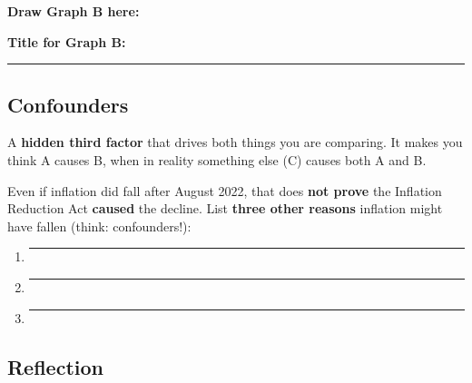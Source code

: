 \documentclass[letterpaper,10pt]{article}
\begin{document}
\vspace{1em}
\noindent\textbf{Draw Graph B here:}

\vspace{0.3em}
\begin{center}
\end{center}

\noindent\textbf{Title for Graph B:} \rule{8cm}{0.4pt}

\subsection*{Confounders}

\begin{definitionbox}[Confounder]
  A \textbf{hidden third factor} that drives both things you are comparing. It makes you think A causes B, when in reality something else (C) causes both A and B.
\end{definitionbox}

\vspace{0.5em}
Even if inflation did fall after August 2022, that does \textbf{not prove} the
Inflation Reduction Act \textbf{caused} the decline. List \textbf{three other
reasons} inflation might have fallen (think: confounders!):

\vspace{0.5em}
\begin{enumerate}[itemsep=1.5em]
  \item \rule{12cm}{0.4pt}
  \item \rule{12cm}{0.4pt}
  \item \rule{12cm}{0.4pt}
\end{enumerate}

\subsection*{Reflection}
\end{document}
